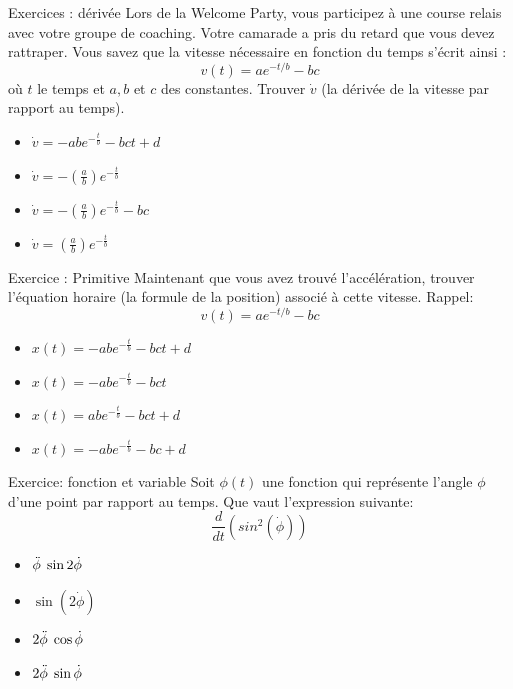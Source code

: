 \documentclass[xcolor=table]{beamer}
\begin{document}
\begin{frame}{Exercices : dérivée}
     Lors de la Welcome Party, vous participez à une course relais avec votre groupe de coaching. Votre camarade a pris du retard que vous devez rattraper. Vous savez que la vitesse nécessaire en fonction du temps s’écrit ainsi : \[v(t) = a e^{-t/b}-bc \]
où $t$ le temps et $a,b$ et $c$ des constantes. Trouver $\Dot{v}$ (la dérivée de la vitesse par rapport au temps).

    \begin{itemize}
        \item $\Dot{v} = -ab e^{-\frac{t}{b}}-bct +d$
        \item $\Dot{v} =- (\frac{a}{b})e^{-\frac{t}{b}}$ %
        \item $\Dot{v} =- (\frac{a}{b})e^{-\frac{t}{b}}-bc$
        \item $\Dot{v} = (\frac{a}{b})e^{-\frac{t}{b}}$ 
    \end{itemize}
\end{frame}

\begin{frame}{Exercice : Primitive}
    Maintenant que vous avez trouvé l'accélération, trouver l'équation horaire (la formule de la position) associé à cette vitesse. Rappel:
     \[v(t) = a e^{-t/b}-bc \]
    
    \begin{itemize}
        \item  $x(t) = -abe^{-\frac{t}{b}}-bct +d$
        \item $x(t) = -abe^{-\frac{t}{b}}-bct $
        \item $x(t) = abe^{-\frac{t}{b}}-bct +d$
        \item $x(t) = -abe^{-\frac{t}{b}}-bc +d$

    \end{itemize}
\end{frame}

\begin{frame}{Exercice: fonction et variable}
Soit $\phi(t)$ une fonction qui représente l'angle $\phi$ d'une point par rapport au temps. Que vaut l'expression suivante:
    \[ \frac{d}{dt}(sin^2(\Dot{\phi}))\] %
    \begin{itemize}
        \item $\Ddot{\phi} \; \sin{2 \Dot{\phi}}$ %
        \item $\sin{(2 \Dot{\phi})}$ %
        \item $ 2\Ddot{\phi} \; \cos{\Dot{\phi}} $ %
        \item $2 \Ddot{\phi} \; \sin{\Dot{\phi}}$
    \end{itemize}
    
\end{frame}
\end{document}
